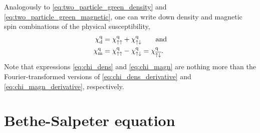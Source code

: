 \documentclass[../../main.tex]{subfiles}
\begin{document}
Analogously to \eqref{eq:two_particle_green_density} and \eqref{eq:two_particle_green_magnetic}, one can write down density and magnetic spin combinations of the physical susceptibility,
\begin{subequations}
\begin{align}
	\chi_{\text{d}}^{\text{q}}&=\chi_{\uparrow\uparrow}^{\text{q}}+\chi_{\uparrow\downarrow}^{\text{q}}\qquad\text{and}\label{eq:chi_dens}\\
	\chi_{\text{m}}^{\text{q}}&=\chi_{\uparrow\uparrow}^{\text{q}}-\chi_{\uparrow\downarrow}^{\text{q}}=\chi_{\overline{\uparrow\downarrow}}^{\text{q}}.\label{eq:chi_magn}
\end{align}
\end{subequations}
Note that expressions \eqref{eq:chi_dens} and \eqref{eq:chi_magn} are nothing more than the Fourier-transformed versions of \eqref{eq:chi_dens_derivative} and \eqref{eq:chi_magn_derivative}, respectively.

\section{Bethe-Salpeter equation}\label{sec:bethe_salpeter}
\end{document}
